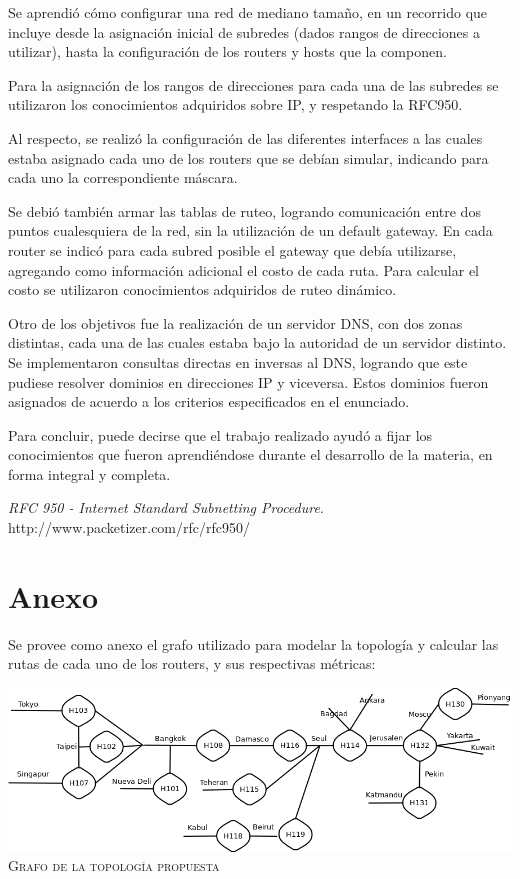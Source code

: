 \documentclass[12pt,titlepage]{article}
\begin{document}
Se aprendi\'o c\'omo configurar una red de mediano tamaño, en un recorrido que incluye desde la asignaci\'on inicial de subredes (dados rangos de direcciones a utilizar), hasta la configuraci\'on de los routers y hosts que la componen.

Para la asignaci\'on de los rangos de direcciones para cada una de las subredes se utilizaron los conocimientos adquiridos sobre IP, y respetando la RFC950.

Al respecto, se realiz\'o la configuraci\'on de las diferentes interfaces a las cuales estaba asignado cada uno de los routers que se deb\'ian simular, indicando para cada uno la correspondiente m\'ascara.

Se debi\'o tambi\'en armar las tablas de ruteo, logrando comunicaci\'on entre dos puntos cualesquiera de la red, sin la utilizaci\'on de un default gateway. En cada router se indic\'o para cada subred posible el gateway que deb\'ia utilizarse, agregando como informaci\'on adicional el costo de cada ruta. Para calcular el costo se utilizaron conocimientos adquiridos de ruteo din\'amico.

Otro de los objetivos fue la realizaci\'on de un servidor DNS, con dos zonas distintas, cada una de las cuales estaba bajo la autoridad de un servidor distinto. Se implementaron consultas directas en inversas al DNS, logrando que este pudiese resolver dominios en direcciones IP y viceversa. Estos dominios fueron asignados de acuerdo a los criterios especificados en el enunciado.

Para concluir, puede decirse que el trabajo realizado ayud\'o a fijar los conocimientos que fueron aprendi\'endose durante el desarrollo de la materia, en forma integral y completa.


\newpage

\begin{thebibliography}{9}

  \emph{RFC 950 - Internet Standard Subnetting Procedure}. \\
  http://www.packetizer.com/rfc/rfc950/

\end{thebibliography}

\newpage
\section{Anexo}
Se provee como anexo el grafo utilizado para modelar la topolog\'ia y calcular las rutas de cada uno de los routers, y sus respectivas m\'etricas:

\begin{center}
\includegraphics[scale=0.3]{./grafo}\\
\small{\textsc{Grafo de la topolog\'ia propuesta}}\\
\end{center}

\end{document}

